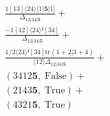 \documentclass[varwidth, border=5pt]{standalone}
\newcommand{\tr}{\text{tr}}
\begin{document}
\begin{my}
$\begin{gathered}
\scriptscriptstyle\frac{1[13]⟨24⟩⟨1|𝟓|1]}{Δ_{12|34|𝟓}} +\\
\scriptscriptstyle\frac{-1[12]⟨24⟩²[34]}{Δ_{12|34|𝟓}} +\\
\scriptscriptstyle\frac{1/2⟨24⟩²[34]\tr(1+2|3+4)}{⟨12⟩Δ_{12|34|𝟓}} +\\
\scriptscriptstyle(3412𝟓,\;\text{False}) +\\
\scriptscriptstyle(2143𝟓,\;\text{True}) +\\
\scriptscriptstyle(4321𝟓,\;\text{True}) \phantom{+}
\end{gathered}$
\end{my}
\end{document}
